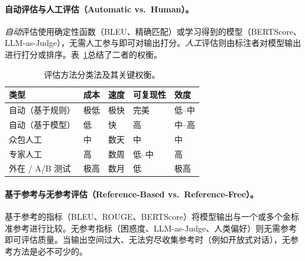 \paragraph{自动评估与人工评估（Automatic vs.~Human）。}
\label{automatic-vs.-human-evaluation.}

\emph{自动}评估使用确定性函数（BLEU、精确匹配）或学习得到的模型（BERTScore、LLM-as-Judge），无需人工参与即可对输出打分。\emph{人工}评估则由标注者对模型输出进行打分或排序。表~\ref{tab:eval-taxonomy}总结了二者的权衡。

\begin{table}[ht!]
\centering\small
\caption{评估方法分类法及其关键权衡。}
\label{tab:eval-taxonomy}
\begin{tabular}{@{}l l l l l@{}}
\toprule
\textbf{类型} & \textbf{成本} & \textbf{速度} & \textbf{可复现性} & \textbf{效度} \\
\midrule
自动（基于规则） & 极低 & 极快 & 完美 & 低--中 \\
自动（基于模型） & 低 & 快 & 高 & 中--高 \\
众包人工 & 中 & 数天 & 中 & 中 \\
专家人工 & 高 & 数周 & 低--中 & 高 \\
外在 / A/B 测试 & 极高 & 数月 & 低 & 极高 \\
\bottomrule
\end{tabular}
\end{table}

\paragraph{基于参考与无参考评估（Reference-Based vs.~Reference-Free）。}
\label{reference-based-vs.-reference-free-evaluation.}

基于参考的指标（BLEU、ROUGE、BERTScore）将模型输出与一个或多个金标准参考进行比较。无参考指标（困惑度、LLM-as-Judge、人类偏好）则无需参考即可评估质量。当输出空间过大、无法穷尽收集参考时（例如开放式对话），无参考方法是必不可少的。

